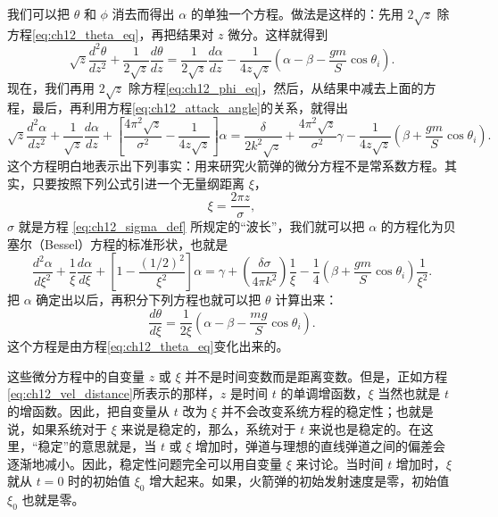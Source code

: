 我们可以把 $\theta$ 和 $\phi$ 消去而得出 $\alpha$ 的单独一个方程。做法是这样的：先用 $2\sqrt{z}$ 除方程\eqref{eq:ch12_theta_eq}，再把结果对 $z$ 微分。这样就得到
\begin{equation*}
\sqrt{z} \frac{d^2\theta}{dz^2} + \frac{1}{2\sqrt{z}} \frac{d\theta}{dz} = \frac{1}{2\sqrt{z}} \frac{d\alpha}{dz} - \frac{1}{4z\sqrt{z}} \left( \alpha - \beta - \frac{gm}{S}\cos\theta_i \right).
\end{equation*}
现在，我们再用 $2\sqrt{z}$ 除方程\eqref{eq:ch12_phi_eq}，然后，从结果中减去上面的方程，最后，再利用方程\eqref{eq:ch12_attack_angle}的关系，就得出
\begin{equation*}
\sqrt{z} \frac{d^2\alpha}{dz^2} + \frac{1}{\sqrt{z}} \frac{d\alpha}{dz} + \left[ \frac{4\pi^2\sqrt{z}}{\sigma^2} - \frac{1}{4z\sqrt{z}} \right] \alpha = \frac{\delta}{2k^2\sqrt{z}} + \frac{4\pi^2\sqrt{z}}{\sigma^2} \gamma - \frac{1}{4z\sqrt{z}} \left( \beta + \frac{gm}{S}\cos\theta_i \right).
\end{equation*}
这个方程明白地表示出下列事实：用来研究火箭弹的微分方程不是常系数方程。其实，只要按照下列公式引进一个无量纲距离 $\xi$，
\begin{equation}\label{eq:ch12_xi_def}
\xi = \frac{2\pi z}{\sigma},
\end{equation}
$\sigma$ 就是方程 \eqref{eq:ch12_sigma_def} 所规定的“波长”，我们就可以把 $\alpha$ 的方程化为贝塞尔（Bessel）方程的标准形状，也就是
\begin{equation}\label{eq:ch12_bessel_alpha}
\frac{d^2 \alpha}{d \xi^2} + \frac{1}{\xi} \frac{d \alpha}{d \xi} + \left[ 1 - \frac{(1/2)^2}{\xi^2} \right] \alpha = \gamma + \left( \frac{\delta \sigma}{4 \pi k^2} \right) \frac{1}{\xi} - \frac{1}{4} \left( \beta + \frac{g m}{S} \cos \theta_i \right) \frac{1}{\xi^2}.
\end{equation}
把 $\alpha$ 确定出以后，再积分下列方程也就可以把 $\theta$ 计算出来：
\begin{equation}\label{eq:ch12_dtheta_dxi}
\frac{d \theta}{d \xi} = \frac{1}{2 \xi} \left( \alpha - \beta - \frac{m g}{S} \cos \theta_i \right).
\end{equation}
这个方程是由方程\eqref{eq:ch12_theta_eq}变化出来的。

这些微分方程中的自变量 $z$ 或 $\xi$ 并不是时间变数而是距离变数。但是，正如方程\eqref{eq:ch12_vel_distance}所表示的那样，$z$ 是时间 $t$ 的单调增函数，$\xi$ 当然也就是 $t$ 的增函数。因此，把自变量从 $t$ 改为 $\xi$ 并不会改变系统方程的稳定性；也就是说，如果系统对于 $\xi$ 来说是稳定的，那么，系统对于 $t$ 来说也是稳定的。在这里，“稳定”的意思就是，当 $t$ 或 $\xi$ 增加时，弹道与理想的直线弹道之间的偏差会逐渐地减小。因此，稳定性问题完全可以用自变量 $\xi$ 来讨论。当时间 $t$ 增加时，$\xi$ 就从 $t=0$ 时的初始值 $\xi_0$ 增大起来。如果，火箭弹的初始发射速度是零，初始值 $\xi_0$ 也就是零。

